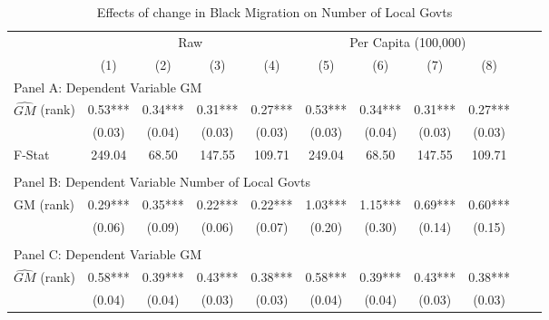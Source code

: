  \begin{table}[htbp]\centering {} \begin{threeparttable} \caption{Effects of change in Black Migration on Number of Local Govts} \begin{tabular}{l*{10}{c}} \toprule
                &\multicolumn{4}{c}{Raw}                                    &\multicolumn{4}{c}{Per Capita (100,000)}                   \\\cmidrule(lr){2-5}\cmidrule(lr){6-9}
                &\multicolumn{1}{c}{(1)}   &\multicolumn{1}{c}{(2)}   &\multicolumn{1}{c}{(3)}   &\multicolumn{1}{c}{(4)}   &\multicolumn{1}{c}{(5)}   &\multicolumn{1}{c}{(6)}   &\multicolumn{1}{c}{(7)}   &\multicolumn{1}{c}{(8)}   \\
\cmidrule(lr){1-9}
\multicolumn{8}{l}{Panel A: Dependent Variable GM}\\
\cmidrule(lr){1-9}
$\hat{GM}$ (rank)&       0.53***&       0.34***&       0.31***&       0.27***&       0.53***&       0.34***&       0.31***&       0.27***\\
                &     (0.03)   &     (0.04)   &     (0.03)   &     (0.03)   &     (0.03)   &     (0.04)   &     (0.03)   &     (0.03)   \\
\midrule
F-Stat          &     249.04   &      68.50   &     147.55   &     109.71   &     249.04   &      68.50   &     147.55   &     109.71   \\
\cmidrule[\heavyrulewidth](lr){1-9} \\ \cmidrule[\heavyrulewidth](lr){1-9}
\multicolumn{8}{l}{Panel B: Dependent Variable Number of Local Govts}\\
\cmidrule(lr){1-9}
GM  (rank)      &       0.29***&       0.35***&       0.22***&       0.22***&       1.03***&       1.15***&       0.69***&       0.60***\\
                &     (0.06)   &     (0.09)   &     (0.06)   &     (0.07)   &     (0.20)   &     (0.30)   &     (0.14)   &     (0.15)   \\
\cmidrule[\heavyrulewidth](lr){1-9} \\ \cmidrule[\heavyrulewidth](lr){1-9}
\multicolumn{8}{l}{Panel C: Dependent Variable GM}\\
\cmidrule(lr){1-9}
$\hat{GM}$ (rank)&       0.58***&       0.39***&       0.43***&       0.38***&       0.58***&       0.39***&       0.43***&       0.38***\\
                &     (0.04)   &     (0.04)   &     (0.03)   &     (0.03)   &     (0.04)   &     (0.04)   &     (0.03)   &     (0.03)   \\

\end{tabular}
\end{threeparttable}
\end{table}
